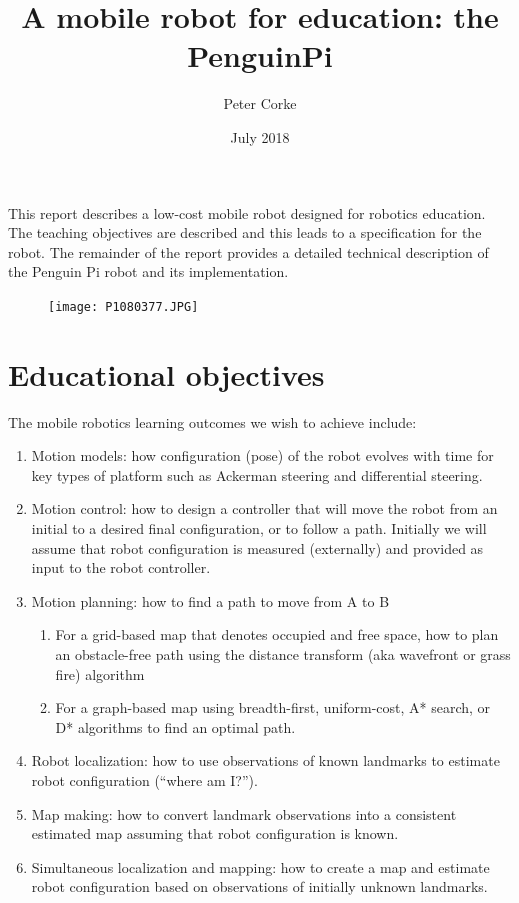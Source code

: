 \documentclass[11pt,fleqn]{article}
\title{A mobile robot for education: the PenguinPi}
\author{Peter Corke}
\date{July 2018} %
\makeatletter
\let\Date\@date
\makeatother
\begin{document}
\maketitle
\pagestyle{fancyplain}
\rfoot{Revision of \Date }


This report describes a low-cost mobile robot  designed for robotics education.
The teaching objectives are described and this leads to a specification for the robot.
The remainder of the report provides a detailed technical description of the Penguin Pi  robot and its implementation.

\begin{figure}[h]
\centering
\texttt{[image: P1080377.JPG]}
\end{figure}

\newpage
\tableofcontents
\newpage

\section{Educational objectives}

The mobile robotics learning outcomes we wish to achieve include:
\begin{enumerate}
\item Motion models: how configuration (pose) of the robot evolves with time for key types of platform such as Ackerman steering and differential steering.
\item Motion control: how to design a controller that will move the robot from an initial to a desired final configuration, or to follow a path.  
Initially we will assume that robot configuration is measured (externally) and provided as input to the robot controller.
\item Motion planning: how to find a path to move from A to B
\begin{enumerate}
  \item For a grid-based map that denotes occupied and free space, how to plan an obstacle-free path using the distance transform (aka wavefront or grass fire) algorithm
  \item For a graph-based map using breadth-first, uniform-cost, A* search, or D* algorithms to find an optimal path.
\end{enumerate}
\item Robot localization: how to use observations of known landmarks to estimate robot configuration (``where am I?'').
\item Map making: how to convert landmark observations into a consistent estimated map  assuming that robot configuration is known.
\item Simultaneous localization and mapping: how to create a map and estimate robot configuration based on observations of initially unknown landmarks.
\end{enumerate}
\end{document}
